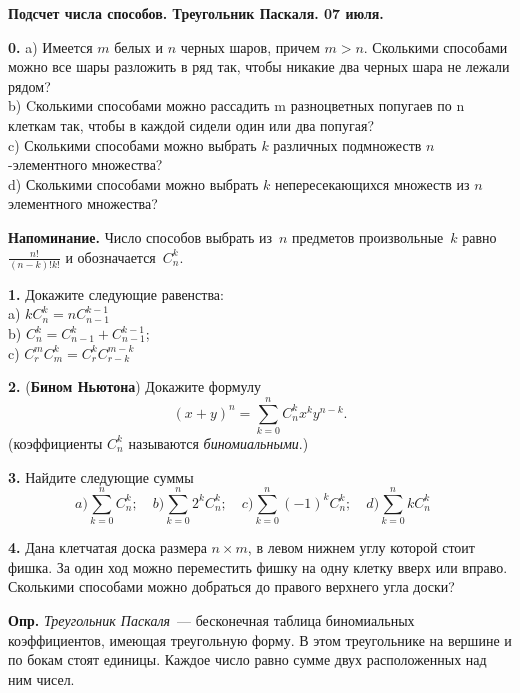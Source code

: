 \begin{center}
\Large
\textbf{Подсчет числа способов. Треугольник Паскаля. 07 июля.}
\end{center}  

\def\q#1.{{\smallskip\bf #1.}}
\q0. a) Имеется $m$ белых и $n$ черных шаров, причем  $m > n$.
Сколькими способами можно все шары разложить в ряд так, чтобы
никакие два черных шара не лежали рядом? \\
b) Cколькими способами можно рассадить m разноцветных попугаев по n клеткам так, чтобы в каждой сидели один или два попугая?\\
c) Сколькими способами можно выбрать $k$ различных подмножеств $n$-элементного множества?\\
d) Сколькими способами можно выбрать $k$ непересекающихся множеств из $n$ элементного множества?

\medskip

{\bf Напоминание.} Число способов выбрать из~$n$ предметов
произвольные~$k$ равно~$\frac{n!}{(n-k)!k!}$ и обозначается~$C_n^k$.

\q1. Докажите следующие равенства: \\
 a) $kC_n^k=nC_{n-1}^{k-1}$\\
 b) $C_n^k=C_{n-1}^k + C_{n-1}^{k-1}$;\\
 c) $C_r^mC_m^k=C_r^kC_{r-k}^{m-k}$

\q2. ({\bf Бином Ньютона}) Докажите формулу
$$(x+y)^n=\sum_{k=0}^nC_n^kx^ky^{n-k}.$$
(коэффициенты $C_n^k$ называются {\it биномиальными}.)

\q3. Найдите следующие суммы
\begin{equation*}
a) \sum_{k=0}^n C_n^k; \quad b) \sum_{k=0}^n 2^kC_n^k; \quad c)
\sum_{k=0}^n (-1)^kC_n^k; \quad d) \sum_{k=0}^n kC_n^k \quad
\end{equation*}


\q4. Дана клетчатая доска размера $n \times m$, в левом нижнем углу
которой стоит фишка. За один ход можно переместить фишку на одну
клетку вверх или вправо. Сколькими способами можно добраться до
правого верхнего угла доски?



\medskip

{\bf Опр.} {\it Треугольник Паскаля}~--- бесконечная таблица
биномиальных коэффициентов, имеющая треугольную форму. В этом
треугольнике на вершине и по бокам стоят единицы. Каждое число равно
сумме двух расположенных над ним чисел.

\medskip

